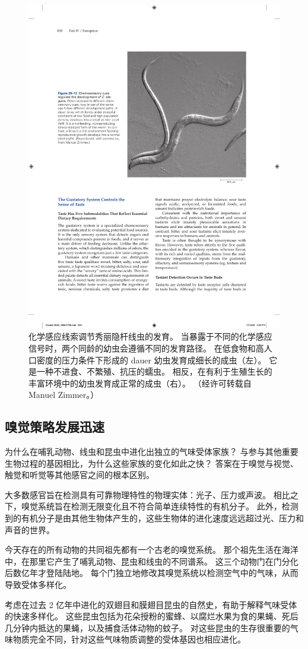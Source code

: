 \begin{figure}[htbp]
	\centering
	\includegraphics[width=0.6\linewidth]{chap29/fig_29_12}
	\caption{化学感应线索调节秀丽隐杆线虫的发育。 当暴露于不同的化学感应信号时，两个同龄的幼虫会遵循不同的发育路径。 在低食物和高人口密度的压力条件下形成的 dauer 幼虫发育成细长的成虫（左）。 它是一种不进食、不繁殖、抗压的蠕虫。 相反，在有利于生殖生长的丰富环境中的幼虫发育成正常的成虫（右）。 （经许可转载自 Manuel Zimmer。）}
	\label{fig:29_12}
\end{figure}



\subsection{嗅觉策略发展迅速}

为什么在哺乳动物、线虫和昆虫中进化出独立的气味受体家族？
与参与其他重要生物过程的基因相比，为什么这些家族的变化如此之快？
答案在于嗅觉与视觉、触觉和听觉等其他感官之间的根本区别。


大多数感官旨在检测具有可靠物理特性的物理实体：光子、压力或声波。
相比之下，嗅觉系统旨在检测无限变化且不符合简单连续特性的有机分子。
此外，检测到的有机分子是由其他生物体产生的，这些生物体的进化速度远远超过光、压力和声音的世界。


今天存在的所有动物的共同祖先都有一个古老的嗅觉系统。
那个祖先生活在海洋中，在那里它产生了哺乳动物、昆虫和线虫的不同谱系。
这三个动物门在门分化后数亿年才登陆陆地。
每个门独立地修改其嗅觉系统以检测空气中的气味，从而导致受体多样化。


考虑在过去 2 亿年中进化的双翅目和膜翅目昆虫的自然史，有助于解释气味受体的快速多样化。
这些昆虫包括为花朵授粉的蜜蜂、以腐烂水果为食的果蝇、死后几分钟内抵达的果蝇，以及捕食活体动物的蚊子。
对这些昆虫的生存很重要的气味物质完全不同，针对这些气味物质调整的受体基因也相应进化。



